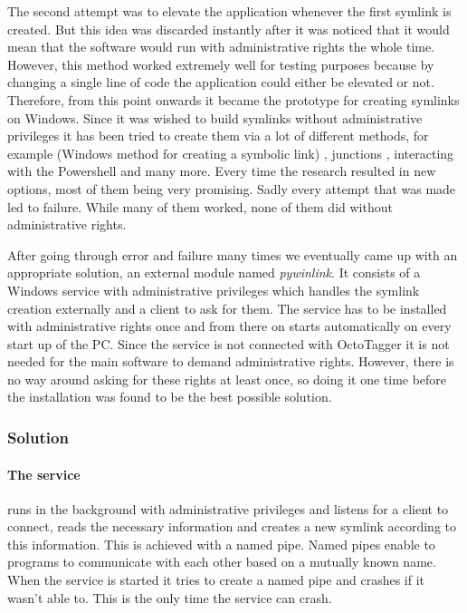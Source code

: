 The second attempt was to elevate the application whenever the first symlink is created. But this idea was discarded instantly after it was noticed that it would mean that the software would run with administrative rights the whole time. However, this method worked extremely well for testing purposes because by changing a single line of code the application could either be elevated or not. Therefore, from this point onwards it became the prototype for creating symlinks on Windows.
Since it was wished to build symlinks without administrative privileges it has been tried to create them via a lot of different methods, for example  (Windows method for creating a symbolic link) \cite{mklink}, junctions \cite{junction}, interacting with the Powershell and many more. Every time the research resulted in new options, most of them being very promising. Sadly every attempt that was made led to failure. While many of them worked, none of them did without administrative rights.
 
After going through error and failure many times we eventually came up with an appropriate solution, an external module named \textit{pywinlink}. It consists of a Windows service with administrative privileges which handles the symlink creation externally and a client to ask for them. The service has to be installed with administrative rights once and from there on starts automatically on every start up of the PC. Since the service is not connected with OctoTagger it is not needed for the main software to demand administrative rights. However, there is no way around asking for these rights at least once, so doing it one time before the installation was found to be the best possible solution. 

\subsubsection{Solution} %

\paragraph{The service} runs in the background with administrative privileges
and listens for a client to connect, reads the necessary information and
creates a new symlink according to this information. This is achieved with a
named pipe. Named pipes enable to programs to communicate with each other based
on a mutually known name. When the service is started it tries to create a
named pipe and crashes if it wasn't able to. This is the only time the service
can crash.

